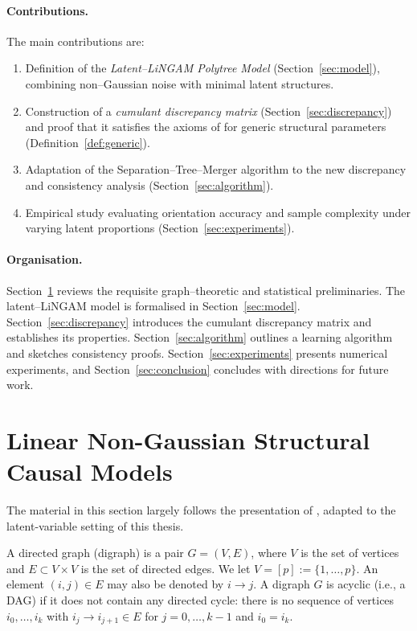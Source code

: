 \documentclass[11pt,a4paper]{article}
\numberwithin{equation}{section}
\begin{document}
\paragraph{Contributions.} The main contributions are:
\begin{enumerate}[label=(C\arabic*)]
  \item Definition of the \emph{Latent--LiNGAM Polytree Model} (Section~\ref{sec:model}), combining non--Gaussian noise with minimal latent structures.
  \item Construction of a \emph{cumulant discrepancy matrix}
  (Section~\ref{sec:discrepancy}) and proof that it satisfies the axioms of
  \citet{etesami:kiyavash:coleman:2016} for generic structural parameters
  (Definition~\ref{def:generic}).
  \item Adaptation of the Separation--Tree--Merger algorithm to the new discrepancy and consistency analysis (Section~\ref{sec:algorithm}).
  \item Empirical study evaluating orientation accuracy and sample complexity under varying latent proportions (Section~\ref{sec:experiments}).
\end{enumerate}

\paragraph{Organisation.} Section~\ref{sec:lingam_background} reviews the requisite graph--theoretic and statistical preliminaries.  The latent--LiNGAM model is formalised in Section~\ref{sec:model}.  Section~\ref{sec:discrepancy} introduces the cumulant discrepancy matrix and establishes its properties.  Section~\ref{sec:algorithm} outlines a learning algorithm and sketches consistency proofs.  Section~\ref{sec:experiments} presents numerical experiments, and Section~\ref{sec:conclusion} concludes with directions for future work.

\newpage
\section{Linear Non-Gaussian Structural Causal Models}
\label{sec:lingam_background}
\noindent The material in this section largely follows the presentation 
of \citet{tramontano:monod:drton:2022}, adapted to the latent-variable 
setting of this thesis.

A directed graph (digraph) is a pair $G = (V, E)$, where $V$ is the set of vertices and $E \subset V \times V$ is the set of directed edges. We let $V = [p] := \{1, \ldots, p\}$. An element $(i, j) \in E$ may also be denoted by $i \to j$. A digraph $G$ is acyclic (i.e., a DAG) if it does not contain any directed cycle: there is no sequence of vertices $i_0, \ldots, i_k$ with $i_j \to i_{j+1} \in E$ for $j = 0, \ldots, k - 1$ and $i_0 = i_k$. 
\end{document}
